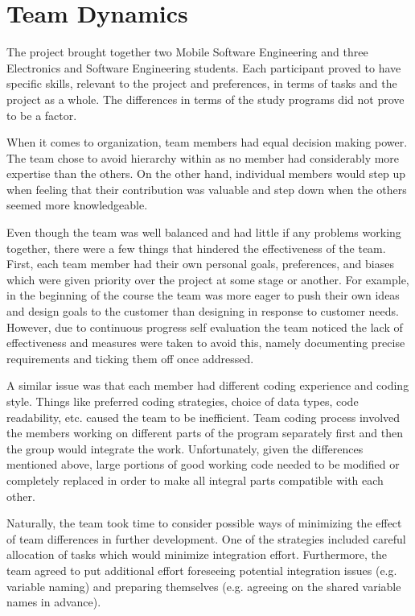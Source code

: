 \documentclass{l3proj}
\begin{document}
\section{Team Dynamics}
\label{sec:teamdynamics}

The project brought together two Mobile Software Engineering and three Electronics and Software Engineering students. Each participant proved to have specific skills, relevant to the project and preferences, in terms of tasks and the project as a whole. The differences in terms of the study programs did not prove to be a factor.
 
When it comes to organization, team members had equal decision making power. The team chose to avoid hierarchy within as no member had considerably more expertise than the others. On the other hand, individual members would step up when feeling that their contribution was valuable and step down when the others seemed more knowledgeable. 

Even though the team was well balanced and had little if any problems working together, there were a few things that hindered the effectiveness of the team. First, each team member had their own personal goals, preferences, and biases which were given priority over the project at some stage or another. For example, in the beginning of the course the team was more eager to push their own ideas and design goals to the customer than designing in response to customer needs. However, due to continuous progress self evaluation the team noticed the lack of effectiveness and measures were taken to avoid this, namely documenting precise requirements and ticking them off once addressed. 

A similar issue was that each member had different coding experience and coding style. Things like preferred coding strategies, choice of data types, code readability, etc. caused the team to be inefficient. Team coding process involved the members working on different parts of the program separately first and then the group would integrate the work. Unfortunately, given the differences mentioned above, large portions of good working code needed to be modified or completely replaced in order to make all integral parts compatible with each other. 

Naturally, the team took time to consider possible ways of minimizing the effect of team differences in further development. One of the strategies included careful allocation of tasks which would minimize integration effort. Furthermore, the team agreed to put additional effort foreseeing potential integration issues (e.g. variable naming) and preparing themselves (e.g. agreeing on the shared variable names in advance).
\end{document}
